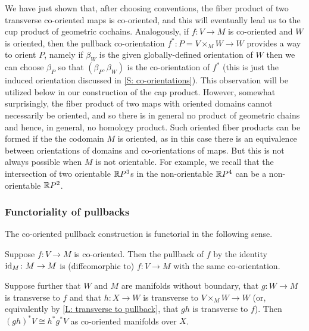 \begin{remark}\label{R: what products exist}
	We have just shown that, after choosing conventions, the fiber product of two transverse co-oriented maps is co-oriented, and this will eventually lead us to the cup product of geometric cochains.
	Analogously, if $f \colon V \to M$ is co-oriented and $W$ is oriented, then the pullback co-orientation $f^* \colon P = V \times_M W \to W$ provides a way to orient $P$, namely if $\beta_W$ is the given globally-defined orientation of $W$ then we can choose $\beta_P$ so that $(\beta_P, \beta_W)$ is the co-orientation of $f^*$ (this is just the induced orientation discussed in \cref{S: co-orientations}).
	This observation will be utilized below in our construction of the cap product.
	However, somewhat surprisingly, the fiber product of two maps with oriented domains cannot necessarily be oriented, and so there is in general no product of geometric chains and hence, in general, no homology product.
	Such oriented fiber products can be formed if the the codomain $M$ is oriented, as in this case there is an equivalence between orientations of domains and co-orientations of maps.
	But this is not always possible when $M$ is not orientable.
	For example, we recall that the intersection of two orientable $\mathbb{R} P^3$s in the non-orientable $\mathbb{R} P^4$ can be a non-orientable $\mathbb{R} P^2$.
\end{remark}

\subsubsection{Functoriality of pullbacks}

The co-oriented pullback construction is functorial in the following sense.

\begin{proposition}\label{P: pullback functoriality}
	Suppose $f \colon V \to M$ is co-oriented.
	Then the pullback of $f$ by the identity $\mathrm{id}_M \colon M \to M$ is (diffeomorphic to) $f \colon V \to M$ with the same co-orientation.

	Suppose further that $W$ and $M$ are manifolds without boundary, that $g \colon W \to M$ is transverse to $f$ and that $h \colon X \to W$ is transverse to $V \times_M W \to W$ (or, equivalently by \cref{L: transverse to pullback}, that $gh$ is transverse to $f$).
	Then $(gh)^*V \cong h^*g^*V$ as co-oriented manifolds over $X$.
\end{proposition}


